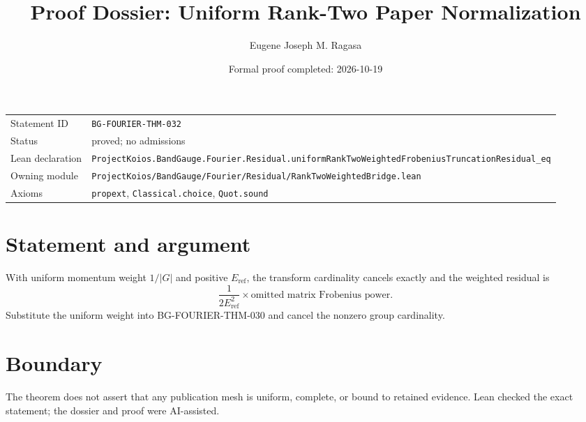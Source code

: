 \documentclass[11pt]{article}
\title{Proof Dossier: Uniform Rank-Two Paper Normalization}
\author{Eugene Joseph M. Ragasa}
\date{Formal proof completed: 2026-10-19}
\begin{document}
\maketitle
\noindent\begin{tabularx}{\textwidth}{@{}lX@{}}\toprule
Statement ID & \texttt{BG-FOURIER-THM-032} \\
Status & proved; no admissions \\
Lean declaration & \texttt{ProjectKoios.BandGauge.Fourier.Residual.}\newline\texttt{uniformRankTwoWeightedFrobeniusTruncationResidual\_eq} \\
Owning module & \texttt{ProjectKoios/BandGauge/Fourier/Residual/RankTwoWeightedBridge.lean} \\
Axioms & \texttt{propext}, \texttt{Classical.choice}, \texttt{Quot.sound} \\
\bottomrule\end{tabularx}
\section{Statement and argument}
With uniform momentum weight $1/|G|$ and positive $E_{\mathrm{ref}}$, the transform cardinality cancels exactly and the weighted residual is
\[
 \frac{1}{2E_{\mathrm{ref}}^2}\times\text{omitted matrix Frobenius power}.
\]
Substitute the uniform weight into BG-FOURIER-THM-030 and cancel the nonzero group cardinality.
\section{Boundary}
The theorem does not assert that any publication mesh is uniform, complete, or bound to retained evidence. Lean checked the exact statement; the dossier and proof were AI-assisted.
\end{document}
